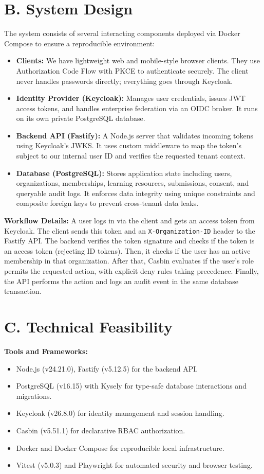 \documentclass{article}
\begin{document}
\section*{B. System Design}
The system consists of several interacting components deployed via Docker Compose to ensure a reproducible environment:
\begin{itemize}
    \item \textbf{Clients:} We have lightweight web and mobile-style browser clients. They use Authorization Code Flow with PKCE to authenticate securely. The client never handles passwords directly; everything goes through Keycloak.
    \item \textbf{Identity Provider (Keycloak):} Manages user credentials, issues JWT access tokens, and handles enterprise federation via an OIDC broker. It runs on its own private PostgreSQL database.
    \item \textbf{Backend API (Fastify):} A Node.js server that validates incoming tokens using Keycloak's JWKS. It uses custom middleware to map the token's subject to our internal user ID and verifies the requested tenant context.
    \item \textbf{Database (PostgreSQL):} Stores application state including users, organizations, memberships, learning resources, submissions, consent, and queryable audit logs. It enforces data integrity using unique constraints and composite foreign keys to prevent cross-tenant data leaks.
\end{itemize}

\textbf{Workflow Details:} A user logs in via the client and gets an access token from Keycloak. The client sends this token and an \texttt{X-Organization-ID} header to the Fastify API. The backend verifies the token signature and checks if the token is an access token (rejecting ID tokens). Then, it checks if the user has an active membership in that organization. After that, Casbin evaluates if the user's role permits the requested action, with explicit deny rules taking precedence. Finally, the API performs the action and logs an audit event in the same database transaction.

\section*{C. Technical Feasibility}
\textbf{Tools and Frameworks:} 
\begin{itemize}
    \item Node.js (v24.21.0), Fastify (v5.12.5) for the backend API.
    \item PostgreSQL (v16.15) with Kysely for type-safe database interactions and migrations.
    \item Keycloak (v26.8.0) for identity management and session handling.
    \item Casbin (v5.51.1) for declarative RBAC authorization.
    \item Docker and Docker Compose for reproducible local infrastructure.
    \item Vitest (v5.0.3) and Playwright for automated security and browser testing.
\end{itemize}
\end{document}
